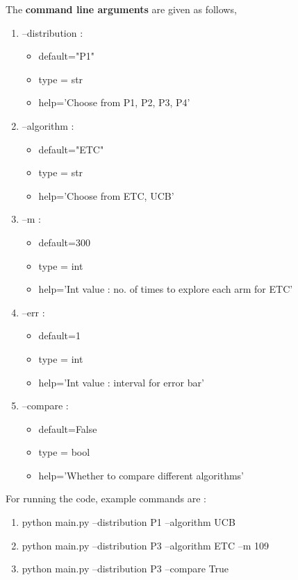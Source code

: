 \documentclass[12pt]{report}
\begin{document}
	\noindent The \textbf{command line arguments} are given as follows,
	\begin{enumerate}
		\item --distribution :
		\begin{itemize}
			\item default="P1"
			\item type = str
			\item help='Choose from P1, P2, P3, P4'
		\end{itemize}		

    	\item --algorithm : 
    	\begin{itemize}
    		\item default="ETC" 
            \item type = str
            \item help='Choose from ETC, UCB'
    	\end{itemize}
                        
		\item --m :
		\begin{itemize}
			\item default=300
            \item type = int
            \item help='Int value : no. of times to explore each arm for ETC'
		\end{itemize}
                        
    	\item --err :
    	\begin{itemize}
    		\item default=1
            \item type = int
            \item help='Int value : interval for error bar'
    	\end{itemize}
                        
		\item --compare :
		\begin{itemize}
		 	\item default=False
            \item type = bool
            \item help='Whether to compare different algorithms'
		\end{itemize}                 
	\end{enumerate}
	
	\noindent For running the code, example commands are : 
	\begin{enumerate}
		\item python main.py --distribution P1 --algorithm UCB
		\item python main.py --distribution P3 --algorithm ETC --m 109
		\item python main.py --distribution P3 --compare True
	\end{enumerate}
	
\end{document}
